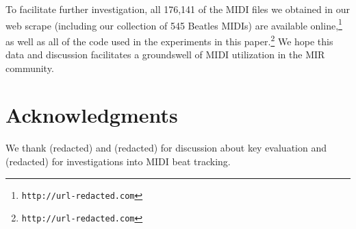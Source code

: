 \documentclass{article}
\begin{document}
To facilitate further investigation, all 176,141 of the MIDI files we obtained in our web scrape (including our collection of 545 Beatles MIDIs) are available online,\footnote{\texttt{http://url-redacted.com}} as well as all of the code used in the experiments in this paper.\footnote{\texttt{http://url-redacted.com}}
We hope this data and discussion facilitates a groundswell of MIDI utilization in the MIR community.

\section{Acknowledgments}

We thank (redacted) %
and (redacted) %
for discussion about key evaluation and (redacted) %
for investigations into MIDI beat tracking.


\end{document}
